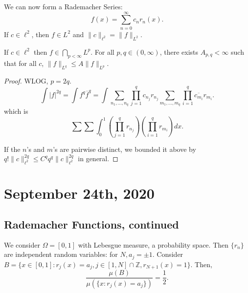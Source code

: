 \documentclass[11pt]{scrartcl}
\newcommand{\Z}{\mathbb{Z}}
\newcommand{\<}{\langle}
\renewcommand{\>}{\rangle}
\begin{document}
We can now form a Rademacher Series: 
$$f(x) = \sum_{n=0}^{\infty} c_n r_n(x).$$
If $c \in \ell^2$, then $f \in L^2$ and $\|c\|_{\ell^2} = \|f\|_{L^2}$.

\begin{thm} If $c \in \ell^2$ then $f \in \bigcap_{p < \infty} L^p$. For all $p, q \in (0, \infty)$, there exists $A_{p, q} < \infty$ such that for all $c$, $\|f\|_{L^q} \le A\|f\|_{L^p}$.
\end{thm}
\begin{proof}
WLOG, $p = 2q$.  
$$\int |f|^{2q} = \int f^q \overline{f}^q = \int \sum_{n_1, \dots, n_q} \prod_{j=1}^q c_{n_j}r_{n_j} \sum_{m_1, \dots, m_q} \prod_{i=1}^q \overline{c_{m_i}} r_{m_i}.$$
which is $$\sum \sum \int_0^1 (\prod_{j=1}^q r_{n_j})(\prod_{i=1}^q r_{m_i})dx.$$

If the $n$'s and $m$'s are pairwise distinct, we bounded it above by $q!\|c\|_{\ell^2}^{2q} \le C^q q^q \|c\|_{\ell^2}^{2q}$ in general.
\end{proof}
\section{September 24th, 2020}
\subsection{Rademacher Functions, continued}
We consider $\Omega = [0, 1]$ with Lebesgue measure, a probability space.  Then $\{r_n\}$ are independent random variables: for $N, a_j = \pm 1$.  Consider $B = \{x \in [0, 1] : r_j(x) = a_j , j \in [1, N] \cap \Z, r_{N+1}(x) = 1\}$.  Then, $$\frac{\mu(B)}{\mu(\{x: r_j(x) = a_j\})} = \frac{1}{2}.$$
\end{document}
